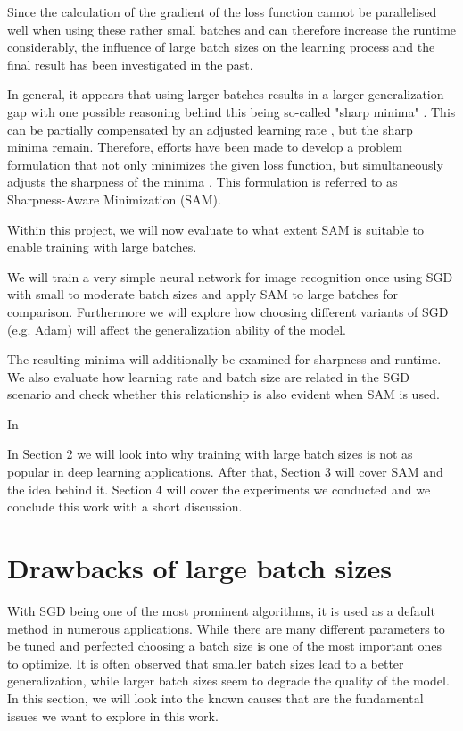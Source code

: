 \documentclass[10pt,conference,compsocconf]{IEEEtran}
\begin{document}
Since the calculation of the gradient of the loss function cannot be parallelised well when using these rather small batches and can therefore increase the runtime considerably, the influence of large batch sizes on the learning process and the final result has been investigated in the past. 

In general, it appears that using larger batches results in a larger generalization gap with one possible reasoning behind this being so-called "sharp minima" \cite{keskar2017largebatch}. This can be partially compensated by an adjusted learning rate \cite{goyal2018accurate}, but the sharp minima remain. 
Therefore, efforts have been made to develop a problem formulation that not only minimizes the given loss function, but simultaneously adjusts the sharpness of the minima \cite{foret2021sharpnessaware}. This formulation is referred to as Sharpness-Aware Minimization (SAM). 


Within this project, we will now evaluate to what extent SAM is suitable to enable training with large batches. 

We will train a very simple neural network for image recognition once using SGD with small to moderate batch sizes and apply SAM to large batches for comparison. Furthermore we will explore how choosing different variants of SGD (e.g. Adam) will affect the generalization ability of the model.

The resulting minima will additionally be examined for sharpness and runtime. 
We also evaluate how learning rate and batch size are related in the SGD scenario and check whether this relationship is also evident when SAM is used. 
 
In \cite{keskar2017largebatch}


In Section 2 we will look into why training with large batch sizes is not as popular in deep learning applications. After that, Section 3 will cover SAM and the idea behind it. Section 4 will cover the experiments we conducted and we conclude this work with a short discussion.

\section{Drawbacks of large batch sizes}
\label{sec:drawbacks-large-bs}

With SGD being one of the most prominent algorithms, it is used as a default method in numerous applications. While there are many different parameters to be tuned and perfected choosing a batch size is one of the most important ones to optimize. It is often observed that smaller batch sizes lead to a better generalization, while larger batch sizes seem to degrade the quality of the model. In this section, we will look into the known causes that are the fundamental issues we want to explore in this work. 
\end{document}
